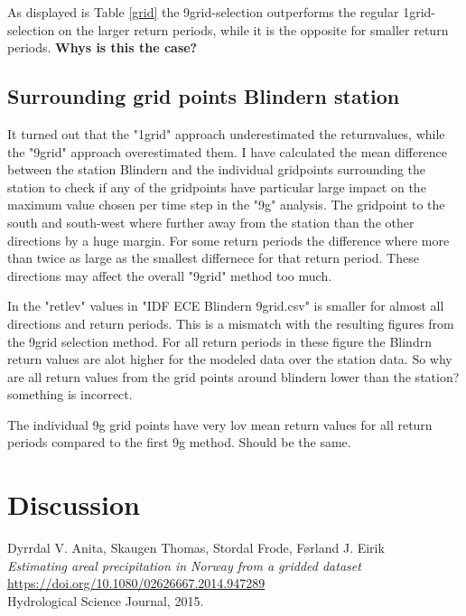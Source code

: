 \documentclass[12pt]{article}
\begin{document}
{As displayed is Table \ref{grid} the 9grid-selection outperforms the regular 1grid-selection on the larger return periods, while it is the opposite for smaller return periods.
\textbf{Whys is this the case?}

\subsection{Surrounding grid points Blindern station}

It turned out that the "1grid" approach underestimated the returnvalues, while the "9grid" approach overestimated them. I have calculated the mean difference between the station Blindern and the individual gridpoints surrounding the station to check if any of the gridpoints have particular large impact on the maximum value chosen per time step in the "9g" analysis. The gridpoint to the south and south-west where further away from the station than the other directions by a huge margin. For some return periods the difference where more than twice as large as the smallest differnece for that return period. These directions may affect the overall "9grid" method too much.   

In the "retlev" values in "IDF ECE Blindern 9grid.csv" is smaller for almost all directions and return periods. This is a mismatch with the resulting figures from the 9grid selection method. For all return periods in these figure the Blindrn return values are alot higher for the modeled data over the station data. So why are all return values from the grid points around blindern lower than the station? something is incorrect.

The individual 9g grid points have very lov mean return values for all return periods compared to the first 9g method. Should be the same. 


\section{Discussion}




\medskip

\begin{thebibliography}{9}


Dyrrdal V. Anita, Skaugen Thomas, Stordal Frode, Førland J. Eirik \\
\textit{Estimating areal precipitation in Norway from a gridded dataset}\\
\url{https://doi.org/10.1080/02626667.2014.947289} \\
Hydrological Science Journal, 2015.\\


\end{thebibliography}}
\end{document}
